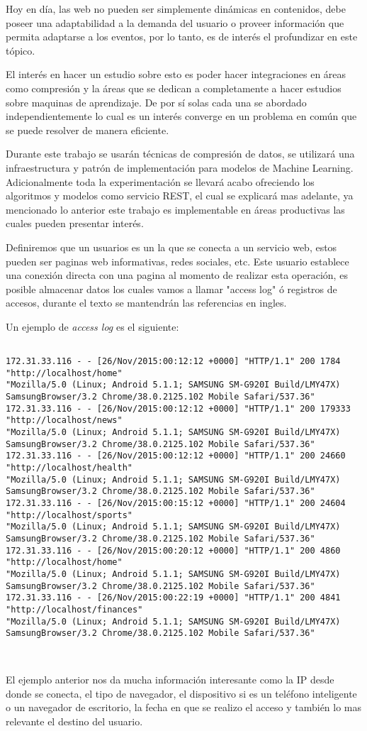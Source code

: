   Hoy en día, las web no pueden ser simplemente dinámicas en contenidos, debe poseer una adaptabilidad a la demanda del usuario o proveer información que permita adaptarse a los eventos, por lo tanto, es de interés el profundizar en este tópico.

  El interés en hacer un estudio sobre esto es poder hacer integraciones en áreas como compresión y la áreas que se dedican a completamente a hacer estudios sobre maquinas de aprendizaje. De por sí solas cada una se abordado independientemente lo cual es un interés converge en un problema en común que se puede resolver de manera eficiente.

  Durante este trabajo se usarán técnicas de compresión de datos, se utilizará una infraestructura y patrón de implementación para modelos de Machine Learning. Adicionalmente toda la experimentación se llevará acabo ofreciendo los algoritmos y modelos como servicio REST, el cual se explicará mas adelante, ya mencionado lo anterior este trabajo es implementable en áreas productivas las cuales pueden presentar interés.

  Definiremos que un usuarios es un la que se conecta a un servicio web, estos pueden ser paginas web informativas, redes sociales, etc. Este usuario establece una conexión directa con una pagina al momento de realizar esta operación, es posible almacenar datos los cuales vamos a llamar "access log" ó registros de accesos, durante el texto se mantendrán las referencias en ingles.

  Un ejemplo de \emph{access log} es el siguiente:


\begin{lstlisting}[frame=single,basicstyle=\ttfamily\tiny,]

172.31.33.116 - - [26/Nov/2015:00:12:12 +0000] "HTTP/1.1" 200 1784 "http://localhost/home" 
"Mozilla/5.0 (Linux; Android 5.1.1; SAMSUNG SM-G920I Build/LMY47X) 
SamsungBrowser/3.2 Chrome/38.0.2125.102 Mobile Safari/537.36"
172.31.33.116 - - [26/Nov/2015:00:12:12 +0000] "HTTP/1.1" 200 179333 "http://localhost/news" 
"Mozilla/5.0 (Linux; Android 5.1.1; SAMSUNG SM-G920I Build/LMY47X) 
SamsungBrowser/3.2 Chrome/38.0.2125.102 Mobile Safari/537.36"
172.31.33.116 - - [26/Nov/2015:00:12:12 +0000] "HTTP/1.1" 200 24660 "http://localhost/health" 
"Mozilla/5.0 (Linux; Android 5.1.1; SAMSUNG SM-G920I Build/LMY47X) 
SamsungBrowser/3.2 Chrome/38.0.2125.102 Mobile Safari/537.36"
172.31.33.116 - - [26/Nov/2015:00:15:12 +0000] "HTTP/1.1" 200 24604 "http://localhost/sports" 
"Mozilla/5.0 (Linux; Android 5.1.1; SAMSUNG SM-G920I Build/LMY47X) 
SamsungBrowser/3.2 Chrome/38.0.2125.102 Mobile Safari/537.36"
172.31.33.116 - - [26/Nov/2015:00:20:12 +0000] "HTTP/1.1" 200 4860 "http://localhost/home" 
"Mozilla/5.0 (Linux; Android 5.1.1; SAMSUNG SM-G920I Build/LMY47X) 
SamsungBrowser/3.2 Chrome/38.0.2125.102 Mobile Safari/537.36"
172.31.33.116 - - [26/Nov/2015:00:22:19 +0000] "HTTP/1.1" 200 4841 "http://localhost/finances" 
"Mozilla/5.0 (Linux; Android 5.1.1; SAMSUNG SM-G920I Build/LMY47X) 
SamsungBrowser/3.2 Chrome/38.0.2125.102 Mobile Safari/537.36"

  	
  \end{lstlisting}

  El ejemplo anterior nos da mucha información interesante como la IP desde donde se conecta, el tipo de navegador, el dispositivo si es un teléfono inteligente o un navegador de escritorio, la fecha en que se realizo el acceso y también lo mas relevante el destino del usuario.